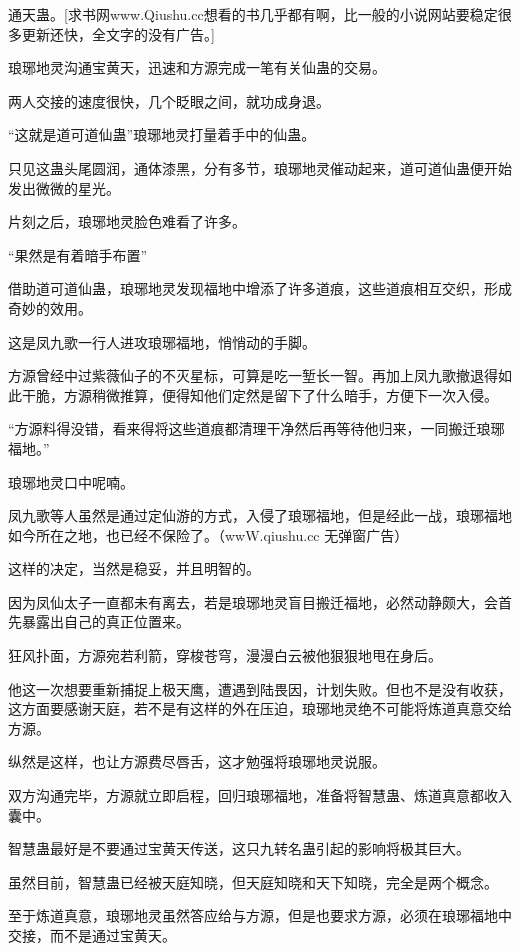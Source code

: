 
\begin{this_body}

通天蛊。[求书网www.Qiushu.cc想看的书几乎都有啊，比一般的小说网站要稳定很多更新还快，全文字的没有广告。]

琅琊地灵沟通宝黄天，迅速和方源完成一笔有关仙蛊的交易。

两人交接的速度很快，几个眨眼之间，就功成身退。

“这就是道可道仙蛊”琅琊地灵打量着手中的仙蛊。

只见这蛊头尾圆润，通体漆黑，分有多节，琅琊地灵催动起来，道可道仙蛊便开始发出微微的星光。

片刻之后，琅琊地灵脸色难看了许多。

“果然是有着暗手布置”

借助道可道仙蛊，琅琊地灵发现福地中增添了许多道痕，这些道痕相互交织，形成奇妙的效用。

这是凤九歌一行人进攻琅琊福地，悄悄动的手脚。

方源曾经中过紫薇仙子的不灭星标，可算是吃一堑长一智。再加上凤九歌撤退得如此干脆，方源稍微推算，便得知他们定然是留下了什么暗手，方便下一次入侵。

“方源料得没错，看来得将这些道痕都清理干净然后再等待他归来，一同搬迁琅琊福地。”

琅琊地灵口中呢喃。

凤九歌等人虽然是通过定仙游的方式，入侵了琅琊福地，但是经此一战，琅琊福地如今所在之地，也已经不保险了。（wwW.qiushu.cc 无弹窗广告）

这样的决定，当然是稳妥，并且明智的。

因为凤仙太子一直都未有离去，若是琅琊地灵盲目搬迁福地，必然动静颇大，会首先暴露出自己的真正位置来。

狂风扑面，方源宛若利箭，穿梭苍穹，漫漫白云被他狠狠地甩在身后。

他这一次想要重新捕捉上极天鹰，遭遇到陆畏因，计划失败。但也不是没有收获，这方面要感谢天庭，若不是有这样的外在压迫，琅琊地灵绝不可能将炼道真意交给方源。

纵然是这样，也让方源费尽唇舌，这才勉强将琅琊地灵说服。

双方沟通完毕，方源就立即启程，回归琅琊福地，准备将智慧蛊、炼道真意都收入囊中。

智慧蛊最好是不要通过宝黄天传送，这只九转名蛊引起的影响将极其巨大。

虽然目前，智慧蛊已经被天庭知晓，但天庭知晓和天下知晓，完全是两个概念。

至于炼道真意，琅琊地灵虽然答应给与方源，但是也要求方源，必须在琅琊福地中交接，而不是通过宝黄天。


\end{this_body}
